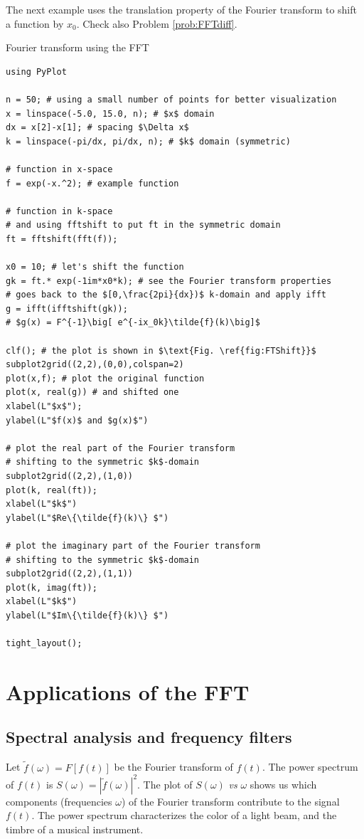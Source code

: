 The next example uses the translation property of the Fourier transform to shift a function by $x_0$. Check also Problem \ref{prob:FFTdiff}.

\begin{example}{Fourier transform using the FFT}
\label{ex:FTShift}
\begin{verbatim}
using PyPlot

n = 50; # using a small number of points for better visualization
x = linspace(-5.0, 15.0, n); # $x$ domain
dx = x[2]-x[1]; # spacing $\Delta x$
k = linspace(-pi/dx, pi/dx, n); # $k$ domain (symmetric)

# function in x-space
f = exp(-x.^2); # example function

# function in k-space
# and using fftshift to put ft in the symmetric domain
ft = fftshift(fft(f)); 

x0 = 10; # let's shift the function
gk = ft.* exp(-1im*x0*k); # see the Fourier transform properties
# goes back to the $[0,\frac{2pi}{dx})$ k-domain and apply ifft
g = ifft(ifftshift(gk)); 
# $g(x) = F^{-1}\big[ e^{-ix_0k}\tilde{f}(k)\big]$

clf(); # the plot is shown in $\text{Fig. \ref{fig:FTShift}}$
subplot2grid((2,2),(0,0),colspan=2)
plot(x,f); # plot the original function
plot(x, real(g)) # and shifted one
xlabel(L"$x$");
ylabel(L"$f(x)$ and $g(x)$")

# plot the real part of the Fourier transform
# shifting to the symmetric $k$-domain
subplot2grid((2,2),(1,0))
plot(k, real(ft));
xlabel(L"$k$")
ylabel(L"$Re\{\tilde{f}(k)\} $")

# plot the imaginary part of the Fourier transform
# shifting to the symmetric $k$-domain
subplot2grid((2,2),(1,1))
plot(k, imag(ft));
xlabel(L"$k$")
ylabel(L"$Im\{\tilde{f}(k)\} $")

tight_layout();
\end{verbatim}
\end{example}

\section{Applications of the FFT}

\subsection{Spectral analysis and frequency filters}

Let $\tilde{f}(\omega) = F[f(t)]$ be the Fourier transform of $f(t)$. The power spectrum of $f(t)$ is $S(\omega) = |\tilde{f}(\omega)|^2$. The plot of $S(\omega)$ \textit{vs} $\omega$ shows us which components (frequencies $\omega$) of the Fourier transform contribute to the signal $f(t)$. The power spectrum characterizes the color of a light beam, and the timbre of a musical instrument.

